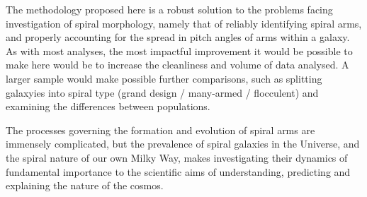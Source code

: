 The methodology proposed here is a robust solution to the problems facing investigation of spiral morphology, namely that of reliably identifying spiral arms, and properly accounting for the spread in pitch angles of arms within a galaxy. As with most analyses, the most impactful improvement it would be possible to make here would be to increase the cleanliness and volume of data analysed. A larger sample would make possible further comparisons, such as splitting galaxyies into spiral type (grand design / many-armed / flocculent) and examining the differences between populations.

The processes governing the formation and evolution of spiral arms are immensely complicated, but the prevalence of spiral galaxies in the Universe, and the spiral nature of our own Milky Way, makes investigating their dynamics of fundamental importance to the scientific aims of understanding, predicting and explaining the nature of the cosmos.

